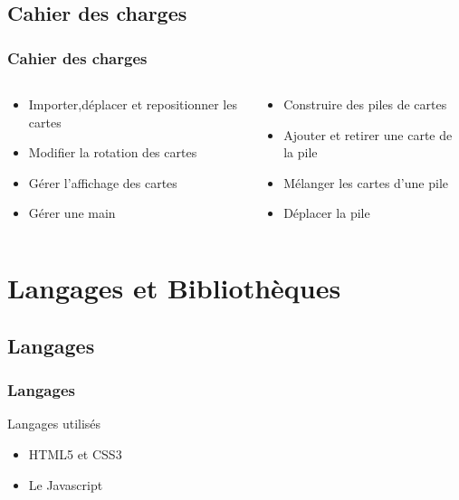 \documentclass[11pt]{beamer}
\begin{document}
\subsection{Cahier des charges}
\begin{frame}
\frametitle{Cahier des charges}
\begin{columns}[t] 
\begin{column}{6cm}
\begin{itemize}
[triangle]
\item Importer,déplacer et repositionner les cartes
\item Modifier la rotation des cartes 
\item Gérer l’affichage des cartes 
\item Gérer une main 
\end{itemize}
\end{column}
\begin{column}{6cm}
\begin{itemize}
[triangle]
\item Construire des piles de cartes
\item Ajouter et retirer une carte de la pile
\item Mélanger les cartes d’une pile
\item Déplacer la pile
\end{itemize}
\end{column}
\end{columns}
\end{frame}

\section{Langages et Bibliothèques}

\subsection{Langages}
\begin{frame}
\frametitle{Langages}
\begin{block}{Langages utilisés}
\begin{itemize}
\item HTML5 et CSS3
\item Le Javascript
\end{itemize}
\end{block}
\begin{figure}
\end{figure}
\end{frame}
\end{document}

